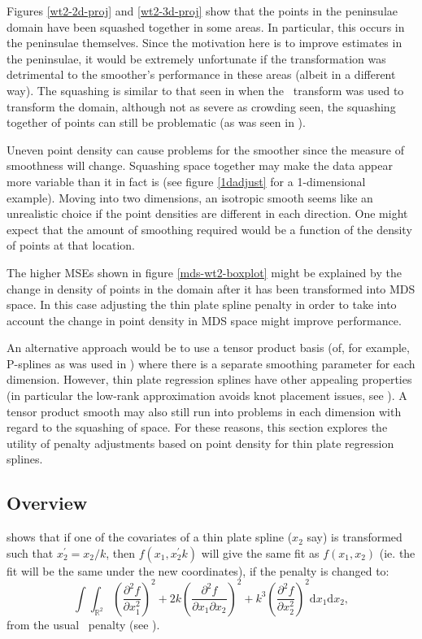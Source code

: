 Figures \ref{wt2-2d-proj} and \ref{wt2-3d-proj} show that the points in the peninsulae domain have been squashed together in some areas. In particular, this occurs in the peninsulae themselves. Since the motivation here is to improve estimates in the peninsulae, it would be extremely unfortunate if the transformation was detrimental to the smoother's performance in these areas (albeit in a different way). The squashing is similar to that seen in  when the \sch\ transform was used to transform the domain, although not as severe as crowding seen, the squashing together of points can still be problematic (as was seen in ). 

Uneven point density can cause problems for the smoother since the measure of smoothness will change.  Squashing space together may make the data appear more variable than it in fact is (see figure \ref{1dadjust} for a 1-dimensional example). Moving into two dimensions, an isotropic smooth seems like an unrealistic choice if the point densities are different in each direction. One might expect that the amount of smoothing required would be a function of the density of points at that location.

The higher MSEs shown in figure \ref{mds-wt2-boxplot} might be explained by the change in density of points in the domain after it has been transformed into MDS space. In this case adjusting the thin plate spline penalty in order to take into account the change in point density in MDS space might improve performance.

An alternative approach would be to use a tensor product basis (of, for example, P-splines as was used in ) where there is a separate smoothing parameter for each dimension. However, thin plate regression splines have other appealing properties (in particular the low-rank approximation avoids knot placement issues, see ). A tensor product smooth may also still run into problems in each dimension with regard to the squashing of space. For these reasons, this section explores the utility of penalty adjustments based on point density for thin plate regression splines.

\subsection{Overview}

 shows that if one of the covariates of a thin plate spline ($x_2$ say) is transformed such that $x_{2}^\prime=x_{2}/k$, then $f(x_1,x_2^\prime k)$ will give the same fit as $f(x_1,x_2)$ (ie. the fit will be the same under the new coordinates), if the penalty is changed to:
\begin{equation}
\int\int_{\mathbb{R}^2} \left ( \frac{\partial^2 f}{\partial x_1^2} \right )^2 + 2k\left ( \frac{\partial^2 f}{\partial x_1 \partial x_2} \right )^2 + k^3\left ( \frac{\partial^2 f}{\partial x_2^2} \right )^2 \text{d}x_1 \text{d}x_2,
\label{adjustedintegral}
\end{equation}
from the usual \tprs\ penalty (see ).

